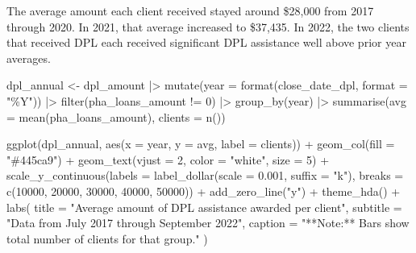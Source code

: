 \documentclass[
  letterpaper,
  DIV=11,
  numbers=noendperiod]{scrartcl}
\newenvironment{Shaded}{\begin{snugshade}}{\end{snugshade}}
\newcommand{\AttributeTok}[1]{\textcolor[rgb]{0.40,0.45,0.13}{#1}}
\newcommand{\DecValTok}[1]{\textcolor[rgb]{0.68,0.00,0.00}{#1}}
\newcommand{\FloatTok}[1]{\textcolor[rgb]{0.68,0.00,0.00}{#1}}
\newcommand{\FunctionTok}[1]{\textcolor[rgb]{0.28,0.35,0.67}{#1}}
\newcommand{\NormalTok}[1]{\textcolor[rgb]{0.00,0.23,0.31}{#1}}
\newcommand{\OtherTok}[1]{\textcolor[rgb]{0.00,0.23,0.31}{#1}}
\newcommand{\SpecialCharTok}[1]{\textcolor[rgb]{0.37,0.37,0.37}{#1}}
\newcommand{\StringTok}[1]{\textcolor[rgb]{0.13,0.47,0.30}{#1}}
\begin{document}
The average amount each client received stayed around \$28,000 from 2017
through 2020. In 2021, that average increased to \$37,435. In 2022, the
two clients that received DPL each received significant DPL assistance
well above prior year averages.

\begin{Shaded}
\begin{Highlighting}[]
\NormalTok{dpl\_annual }\OtherTok{\textless{}{-}}\NormalTok{ dpl\_amount }\SpecialCharTok{|\textgreater{}} 
  \FunctionTok{mutate}\NormalTok{(}\AttributeTok{year =} \FunctionTok{format}\NormalTok{(close\_date\_dpl, }\AttributeTok{format =} \StringTok{"\%Y"}\NormalTok{)) }\SpecialCharTok{|\textgreater{}} 
  \FunctionTok{filter}\NormalTok{(pha\_loans\_amount }\SpecialCharTok{!=} \DecValTok{0}\NormalTok{) }\SpecialCharTok{|\textgreater{}} 
  \FunctionTok{group\_by}\NormalTok{(year) }\SpecialCharTok{|\textgreater{}} 
  \FunctionTok{summarise}\NormalTok{(}\AttributeTok{avg =} \FunctionTok{mean}\NormalTok{(pha\_loans\_amount),}
            \AttributeTok{clients =} \FunctionTok{n}\NormalTok{())}

\FunctionTok{ggplot}\NormalTok{(dpl\_annual, }\FunctionTok{aes}\NormalTok{(}\AttributeTok{x =}\NormalTok{ year, }\AttributeTok{y =}\NormalTok{ avg, }\AttributeTok{label =}\NormalTok{ clients)) }\SpecialCharTok{+}
  \FunctionTok{geom\_col}\NormalTok{(}\AttributeTok{fill =} \StringTok{"\#445ca9"}\NormalTok{) }\SpecialCharTok{+}
  \FunctionTok{geom\_text}\NormalTok{(}\AttributeTok{vjust =} \DecValTok{2}\NormalTok{,}
            \AttributeTok{color =} \StringTok{"white"}\NormalTok{,}
            \AttributeTok{size =} \DecValTok{5}\NormalTok{) }\SpecialCharTok{+}
  \FunctionTok{scale\_y\_continuous}\NormalTok{(}\AttributeTok{labels =} \FunctionTok{label\_dollar}\NormalTok{(}\AttributeTok{scale =} \FloatTok{0.001}\NormalTok{, }\AttributeTok{suffix =} \StringTok{"k"}\NormalTok{),}
                     \AttributeTok{breaks =} \FunctionTok{c}\NormalTok{(}\DecValTok{10000}\NormalTok{, }\DecValTok{20000}\NormalTok{, }\DecValTok{30000}\NormalTok{, }\DecValTok{40000}\NormalTok{, }\DecValTok{50000}\NormalTok{)) }\SpecialCharTok{+}
  \FunctionTok{add\_zero\_line}\NormalTok{(}\StringTok{"y"}\NormalTok{) }\SpecialCharTok{+}
  \FunctionTok{theme\_hda}\NormalTok{() }\SpecialCharTok{+}
  \FunctionTok{labs}\NormalTok{(}
    \AttributeTok{title =} \StringTok{"Average amount of DPL assistance awarded per client"}\NormalTok{,}
    \AttributeTok{subtitle =} \StringTok{"Data from July 2017 through September 2022"}\NormalTok{,}
    \AttributeTok{caption =} \StringTok{"**Note:** Bars show total number of clients for that group."}
\NormalTok{  )}
\end{Highlighting}
\end{Shaded}
\end{document}
